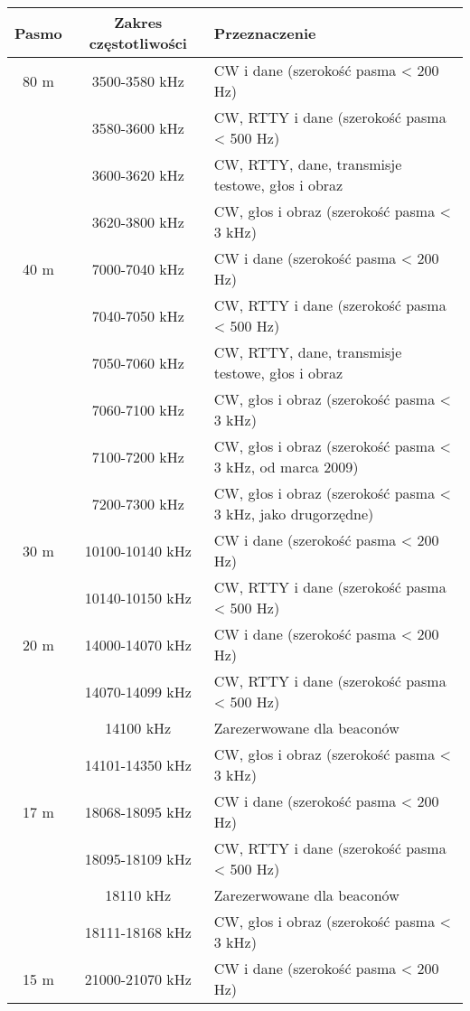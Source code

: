 \documentclass[a4paper,11pt]{article}
\begin{document}
\begin{center}
\begin{tabular}{| c | c | p{8cm} |}
\hline
\textbf{Pasmo} & \textbf{Zakres częstotliwości} & \textbf{Przeznaczenie} \\ \hline
80 m & 3500-3580 kHz & CW i dane (szerokość pasma < 200 Hz) \\ \cline{2-3}
 & 3580-3600 kHz & CW, RTTY i dane (szerokość pasma < 500 Hz) \\ \cline{2-3}
 & 3600-3620 kHz & CW, RTTY, dane, transmisje testowe, głos i obraz \\ \cline{2-3}
 & 3620-3800 kHz & CW, głos i obraz (szerokość pasma < 3 kHz) \\ \hline
40 m & 7000-7040 kHz & CW i dane (szerokość pasma < 200 Hz) \\ \cline{2-3}
 & 7040-7050 kHz & CW, RTTY i dane (szerokość pasma < 500 Hz) \\ \cline{2-3}
 & 7050-7060 kHz & CW, RTTY, dane, transmisje testowe, głos i obraz \\ \cline{2-3}
 & 7060-7100 kHz & CW, głos i obraz (szerokość pasma < 3 kHz) \\ \cline{2-3}
 & 7100-7200 kHz & CW, głos i obraz (szerokość pasma < 3 kHz, od marca 2009) \\ \cline{2-3}
 & 7200-7300 kHz & CW, głos i obraz (szerokość pasma < 3 kHz, jako drugorzędne) \\ \hline
30 m & 10100-10140 kHz & CW i dane (szerokość pasma < 200 Hz) \\ \cline{2-3}
 & 10140-10150 kHz & CW, RTTY i dane (szerokość pasma < 500 Hz) \\ \hline
20 m & 14000-14070 kHz & CW i dane (szerokość pasma < 200 Hz) \\ \cline{2-3}
 & 14070-14099 kHz & CW, RTTY i dane (szerokość pasma < 500 Hz) \\ \cline{2-3}
 & 14100 kHz & Zarezerwowane dla beaconów \\ \cline{2-3}
 & 14101-14350 kHz & CW, głos i obraz (szerokość pasma < 3 kHz) \\ \hline
17 m & 18068-18095 kHz & CW i dane (szerokość pasma < 200 Hz) \\ \cline{2-3}
 & 18095-18109 kHz & CW, RTTY i dane (szerokość pasma < 500 Hz) \\ \cline{2-3}
 & 18110 kHz & Zarezerwowane dla beaconów \\ \cline{2-3}
 & 18111-18168 kHz & CW, głos i obraz (szerokość pasma < 3 kHz) \\ \hline
15 m & 21000-21070 kHz & CW i dane (szerokość pasma < 200 Hz) \\ \cline{2-3}

\end{tabular}
\end{center}
\end{document}
